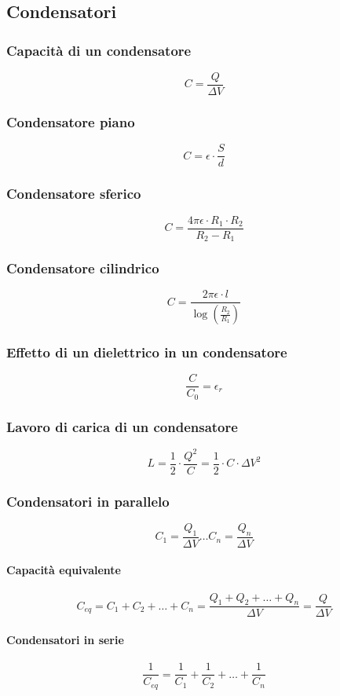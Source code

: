 \documentclass[a4paper,12pt]{article}
\theoremstyle{mystyle}
\begin{document}
\newpage


\subsection{Condensatori}
\subsubsection{Capacità di un condensatore}
\[C = \frac{Q}{\Delta V}\]
\subsubsection{Condensatore piano}
\[C = \epsilon \cdot \frac{S}{d}\]
\subsubsection{Condensatore sferico}
\[C = \frac{4 \pi \epsilon \cdot R_1 \cdot R_2}{R_2 - R_1}\]
\subsubsection{Condensatore cilindrico}
\[C = \frac{2 \pi \epsilon \cdot l}{\log \left(\frac{R_2}{R_1} \right )}\]
\subsubsection{Effetto di un dielettrico in un condensatore}
\[\frac{C}{C_0} = \epsilon_r\]
\subsubsection{Lavoro di carica di un condensatore}
\[L = \frac{1}{2} \cdot \frac{Q^2}{C} = \frac{1}{2} \cdot C \cdot \Delta V^2\]
\subsubsection{Condensatori in parallelo}
\[C_1 = \frac{Q_1}{\Delta V } \ldots C_n = \frac{Q_n}{\Delta V}\]
\paragraph{Capacità equivalente}
\[
{C_{eq}= C_1+C_2+ \ldots + C_n = \frac{Q_1+Q_2+\ldots+Q_n}{\Delta V} = \frac{Q}{\Delta V}}
\]
\paragraph{Condensatori in serie}
\[\frac{1}{C_{eq}} = \frac{1}{C_1}+\frac{1}{C_2} + \ldots + \frac{1}{C_n}\]
\end{document}
